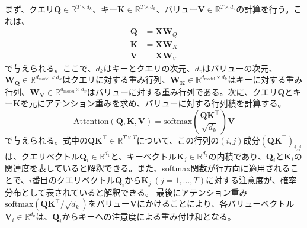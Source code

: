 \documentclass[12pt]{jarticle}
\numberwithin{equation}{section}    %
\numberwithin{figure}{section}      %
\numberwithin{table}{section}      %
\begin{document}
まず、クエリ$\bm{Q} \in \mathbb{R}^{T \times d_{k}}$、キー$\bm{K} \in \mathbb{R}^{T \times d_{k}}$、バリュー$\bm{V} \in \mathbb{R}^{T \times d_{v}}$の計算を行う。これは、
\begin{align}
    \bm{Q} & = \bm{X}\bm{W}_{Q} \\
    \bm{K} & = \bm{X}\bm{W}_{K} \\
    \bm{V} & = \bm{X}\bm{W}_{V}
\end{align}
で与えられる。ここで、$d_{k}$はキーとクエリの次元、$d_{v}$はバリューの次元、$\bm{W_{Q}} \in \mathbb{R}^{d_{\text{model}} \times d_{k}}$はクエリに対する重み行列、$\bm{W_{K}} \in \mathbb{R}^{d_{\text{model}} \times d_{k}}$はキーに対する重み行列、$\bm{W_{V}} \in \mathbb{R}^{d_{\text{model}} \times d_{v}}$はバリューに対する重み行列である。次に、クエリ$\bm{Q}$とキー$\bm{K}$を元にアテンション重みを求め、バリューに対する行列積を計算する。
\begin{equation}
    \text{Attention}(\bm{Q}, \bm{K}, \bm{V}) = \text{softmax}\left(\frac{\bm{Q}\bm{K}^\top}{\sqrt{d_{k}}}\right) \bm{V}
\end{equation}
で与えられる。式中の$\bm{Q}\bm{K}^\top \in \mathbb{R}^{T \times T}$について、この行列の$(i, j)$成分$(\bm{Q}\bm{K}^\top)_{i, j}$は、クエリベクトル$\bm{Q}_{i} \in \mathbb{R}^{d_{k}}$と、キーベクトル$\bm{K}_{j} \in \mathbb{R}^{d_{k}}$の内積であり、$\bm{Q}_{i}$と$\bm{K}_{i}$の関連度を表していると解釈できる。また、softmax関数が行方向に適用されることで、$i$番目のクエリベクトル$\bm{Q}_{i}$から$\bm{K}_{j} ~ (j = 1, \ldots, T)$に対する注意度が、確率分布として表されていると解釈できる。
最後にアテンション重み$\text{softmax}\left(\bm{Q}\bm{K}^\top / \sqrt{d_{k}}\right)$をバリュー$\bm{V}$にかけることにより、各バリューベクトル$\bm{V}_{i} \in \mathbb{R}^{d_{v}}$は、$\bm{Q}_{i}$からキーへの注意度による重み付け和となる。
\end{document}
